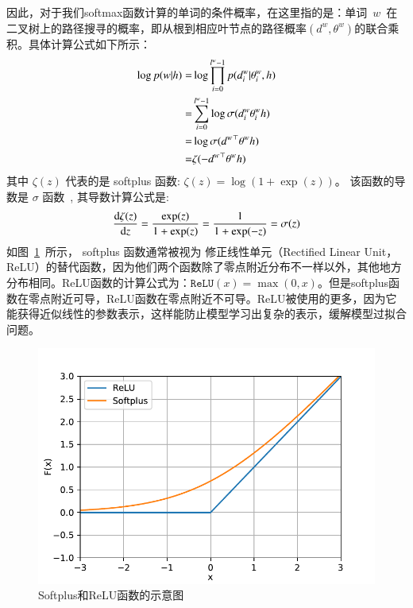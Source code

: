 因此，对于我们softmax函数计算的单词的条件概率，在这里指的是：单词~$w$~在二叉树上的路径搜寻的概率，即从根到相应叶节点的路径概率$(d^w,\theta^w)$的联合乘积。具体计算公式如下所示：
\begin{equation}\label{equ:pw}
\setlength{\abovedisplayskip}{6pt}
\setlength{\belowdisplayskip}{6pt}
\begin{split}
 \log p(w|h)=&\log\prod_{i=0}^{l^w-1} p(d^w_i|\theta_{i}^w,h) \\
 =& \sum_{i=0}^{l^w -1} \log\sigma(d_i^w \theta_{i}^w h)\\
 =&\log\sigma({d^w}^\top \theta^w h)\\
 =&\zeta(- {d^w}^\top \theta^w h )
 \end{split}
\end{equation}
其中 $\zeta(z)$ 代表的是 softplus 函数: $\zeta(z)= \log (1+\exp(z))$。 该函数的导数是 $\sigma$ 函数~, 其导数计算公式是:
\begin{equation}\label{equ:zeta}
\setlength{\abovedisplayskip}{6pt}
\setlength{\belowdisplayskip}{6pt}
\begin{split}
\frac{\mathrm{d}\zeta(z)}{\mathrm{d} z}=\frac{\exp(z)}{1+\exp(z)} =\frac{1}{1+\exp(-z)} =\sigma(z)
\end{split}
\end{equation}
如图~\ref{fig:soft}~所示， softplus 函数通常被视为 修正线性单元（Rectified Linear Unit，ReLU）的替代函数，因为他们两个函数除了零点附近分布不一样以外，其他地方分布相同。ReLU函数的计算公式为：$\mathtt{ReLU}(x)=\max(0,x)$。但是softplus函数在零点附近可导，ReLU函数在零点附近不可导。ReLU被使用的更多，因为它能获得近似线性的参数表示，这样能防止模型学习出复杂的表示，缓解模型过拟合问题。
\begin{figure}[!ht]
  \centering
\includegraphics[width=.65\linewidth]{./figures/relus.pdf}
\caption{Softplus和ReLU函数的示意图}\label{fig:soft}
\end{figure}

